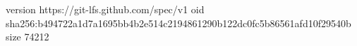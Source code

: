 version https://git-lfs.github.com/spec/v1
oid sha256:b494722a1d7a1695bb4b2e514c2194861290b122dc0fc5b86561afd10f29540b
size 74212
